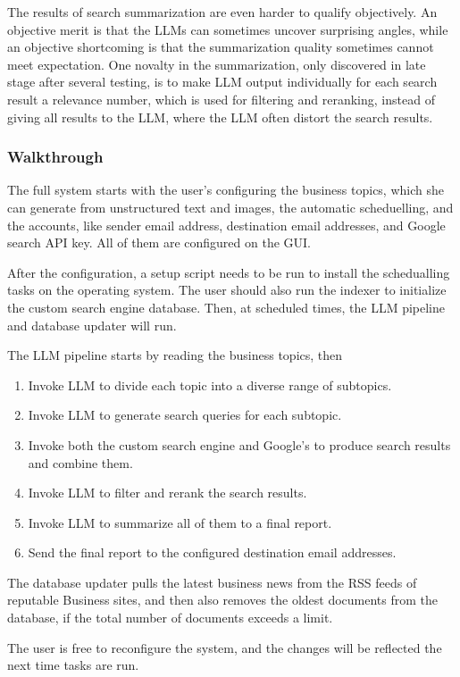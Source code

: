 \documentclass[final-report]{report-template}
\begin{document}
The results of search summarization are even harder to qualify objectively. An
objective merit is that the LLMs can sometimes uncover surprising angles, while
an objective shortcoming is that the summarization quality sometimes cannot
meet expectation. One novalty in the summarization, only discovered in late
stage after several testing, is to make LLM output individually for each search
result a relevance number, which is used for filtering and reranking, instead
of giving all results to the LLM, where the LLM often distort the search
results.

\subsubsection{Walkthrough}
The full system starts with the user's configuring the business topics, which
she can generate from unstructured text and images, the automatic scheduelling,
and the accounts, like sender email address, destination email addresses, and
Google search API key. All of them are configured on the GUI.

After the configuration, a setup script needs to be run to install the
schedualling tasks on the operating system. The user should also run the
indexer to initialize the custom search engine database. Then, at scheduled
times, the LLM pipeline and database updater will run.

The LLM pipeline starts by reading the business topics, then
\begin{enumerate}
	\item Invoke LLM to divide each topic into a diverse range of subtopics.
	\item Invoke LLM to generate search queries for each subtopic.
	\item Invoke both the custom search engine and Google's to produce search
		results and combine them.
	\item Invoke LLM to filter and rerank the search results.
	\item Invoke LLM to summarize all of them to a final report.
	\item Send the final report to the configured destination email addresses.
\end{enumerate}

The database updater pulls the latest business news from the RSS feeds of
reputable Business sites, and then also removes the oldest documents from the
database, if the total number of documents exceeds a limit.

The user is free to reconfigure the system, and the changes will be reflected
the next time tasks are run.
\end{document}
